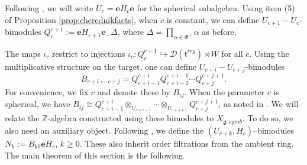 \documentclass{amsart}
\numberwithin{equation}{section}
\theoremstyle{definition}
\newcommand{\fg}{\mathfrak{g}}
\newcommand{\ft}{\mathfrak{t}}
\newcommand{\Z}{{\mathbb Z}}
\newcommand{\Diff}{\mathcal{D}}
\newcommand{\e}{\mathbf{e}}
\begin{document}
Following \cite{GS1}, we will write $U_c=\e H_c \e$ for the spherical subalgebra. Using item (5) of Proposition \ref{prop:cherednikfacts}, when $c$ is constant, we can define $U_{c+1}-U_{c}$-bimodules 
$Q_c^{c+1}:=\e H_{c+1}\e_-\Delta$, where $\Delta=\prod_{\alpha\in\Phi^+}\alpha$ as before. 

The maps $\iota_c$ restrict to injections
 $\iota_c: Q_c^{c+1}\hookrightarrow \Diff(\ft^{reg})\rtimes W$ for all $c$. Using the multiplicative structure on the target, one can define $U_{c+i}-U_{c+j}$-bimodules
$$B_{c+i\leftarrow c+j}=Q_{c+i-1}^{c+i}Q_{c+i-2}^{c+i-1}\cdots Q_{c+j}^{c+j+1}.$$ 
For convenience, we fix $c$ and denote these by $B_{ij}$. 
When the parameter $c$ is spherical, we have $B_{ij}\cong Q_{c+i-1}^{c+i}\otimes_{U_{c+i-1}}\cdots\otimes_{U_{c+j+1}}Q_{c+j}^{c+j+1}$, as noted in \cite[(6.3.2)]{GS1}. We will relate the $\Z$-algebra constructed using these bimodules to $X_{\fg,symb}$. To do so, we also need an auxiliary object. Following \cite[\S6.5]{GS1}, we define the $(U_{c+k},H_c)$–bimodules $N_k:= B_{k0}\e H_c$, $k\geq 0$. These also inherit order filtrations from the ambient ring.
The main theorem of this section is the following.
\end{document}
